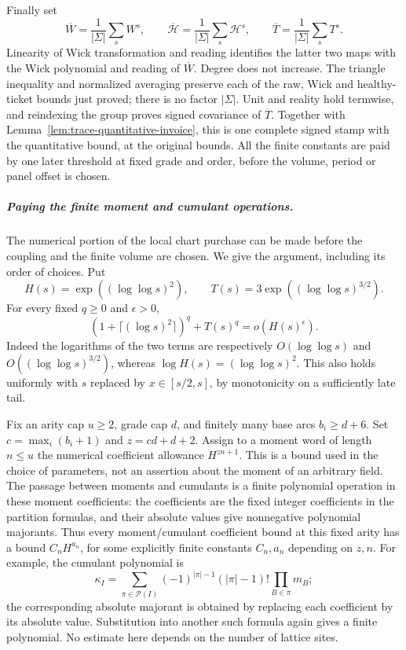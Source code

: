 Finally set
\[
 \overline W=\frac1{|\Sigma|}\sum_sW^s,\qquad
 \overline{\mathcal H}=\frac1{|\Sigma|}\sum_s\mathcal H^s,
 \qquad \overline T=\frac1{|\Sigma|}\sum_sT^s.
\]
Linearity of Wick transformation and reading identifies the latter two
maps with the Wick polynomial and reading of $\overline W$. Degree
does not increase. The triangle inequality and normalized averaging
preserve each of the raw, Wick and healthy-ticket bounds just proved;
there is no factor $|\Sigma|$. Unit and reality hold termwise, and
reindexing the group proves signed covariance of $\overline T$.
Together with Lemma~\ref{lem:trace-quantitative-invoice}, this is one
complete signed stamp with the quantitative bound, at the original
bounds. All the finite constants are paid by one later threshold at
fixed grade and order, before the volume, period or panel offset is
chosen.

\subparagraph{Paying the finite moment and cumulant operations.}
The numerical portion of the local chart purchase can be made before
the coupling and the finite volume are chosen. We give the argument,
including its order of choices. Put
\[
 H(s)=\exp((\log\log s)^2),\qquad
 T(s)=3\exp((\log\log s)^{3/2}).
\]
For every fixed $q\ge0$ and $\epsilon>0$,
\begin{equation}\label{eq:trace-submonitor}
 (1+\lceil(\log s)^2\rceil)^q+T(s)^q
                      =o(H(s)^\epsilon).
\end{equation}
Indeed the logarithms of the two terms are respectively
$O(\log\log s)$ and $O((\log\log s)^{3/2})$, whereas
$\log H(s)=(\log\log s)^2$. This also holds uniformly with $s$
replaced by $x\in[s/2,s]$, by monotonicity on a sufficiently late tail.

Fix an arity cap $u\ge2$, grade cap $d$, and finitely many base arcs
$b_i\ge d+6$. Set $c=\max_i(b_i+1)$ and $z=cd+d+2$.
Assign to a moment word of length $n\le u$ the numerical coefficient
allowance $H^{zn+1}$. This is a bound used in the choice of parameters,
not an assertion about the moment of an arbitrary field. The passage between moments and cumulants is a finite
polynomial operation in these moment coefficients: the coefficients are
the fixed integer coefficients in the partition formulas, and their
absolute values give nonnegative polynomial majorants. Thus every
moment/cumulant coefficient bound at this fixed arity has a bound
$C_nH^{a_n}$, for some explicitly finite constants $C_n,a_n$ depending
on $z,n$. For example, the cumulant polynomial is
\[
 \kappa_I=\sum_{\pi\in\mathcal P(I)}
       (-1)^{|\pi|-1}(|\pi|-1)!\prod_{B\in\pi}m_B;
\]
the corresponding absolute majorant is obtained by replacing each
coefficient by its absolute value. Substitution into another such
formula again gives a finite polynomial. No estimate here depends on
the number of lattice sites.

